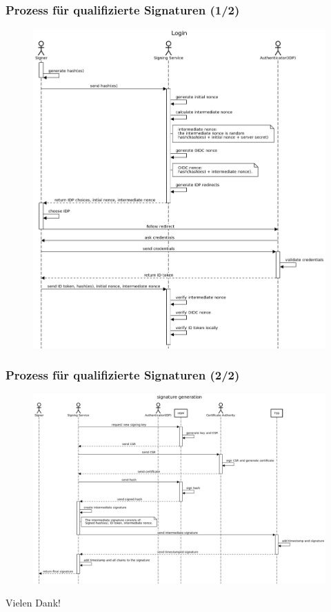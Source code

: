 \documentclass[12pt,xcolor=pdftex,dvipsnames,table]{beamer}
\begin{document}
    \begin{frame}
        \frametitle{Prozess für qualifizierte Signaturen (1/2)}

        \begin{figure}[H]
            \includegraphics[scale=0.2]{images/signature_generation_step1.png}
        \end{figure}
    \end{frame}

    \begin{frame}
        \frametitle{Prozess für qualifizierte Signaturen (2/2)}

        \begin{figure}[H]
            \includegraphics[scale=0.22]{images/signature_generation_step2.png}
        \end{figure}
    \end{frame}

    \begin{frame}
        Vielen Dank!
    \end{frame}
\end{document}

